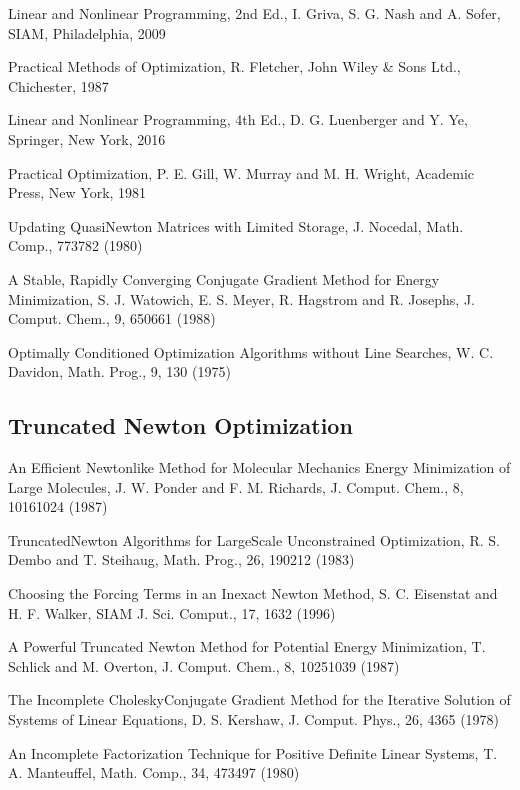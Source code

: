 \documentclass[letterpaper,11pt,english]{sphinxmanual}
\begin{document}
Linear and Nonlinear Programming, 2nd Ed., I. Griva, S. G. Nash and A. Sofer, SIAM, Philadelphia, 2009

Practical Methods of Optimization, R. Fletcher, John Wiley \& Sons Ltd., Chichester, 1987

Linear and Nonlinear Programming, 4th Ed., D. G. Luenberger and Y. Ye, Springer, New York, 2016

Practical Optimization, P. E. Gill, W. Murray and M. H. Wright, Academic Press, New York, 1981

Updating Quasi\sphinxhyphen{}Newton Matrices with Limited Storage, J. Nocedal, Math. Comp., 773\sphinxhyphen{}782 (1980)

A Stable, Rapidly Converging Conjugate Gradient Method for Energy Minimization, S. J. Watowich, E. S. Meyer, R. Hagstrom and R. Josephs, J. Comput. Chem., 9, 650\sphinxhyphen{}661 (1988)

Optimally Conditioned Optimization Algorithms without Line Searches, W. C. Davidon, Math. Prog., 9, 1\sphinxhyphen{}30 (1975)


\subsection{Truncated Newton Optimization}
\label{\detokenize{text/references:truncated-newton-optimization}}
An Efficient Newton\sphinxhyphen{}like Method for Molecular Mechanics Energy Minimization of Large Molecules, J. W. Ponder and F. M. Richards, J. Comput. Chem., 8, 1016\sphinxhyphen{}1024 (1987)

Truncated\sphinxhyphen{}Newton Algorithms for Large\sphinxhyphen{}Scale Unconstrained Optimization, R. S. Dembo and T. Steihaug, Math. Prog., 26, 190\sphinxhyphen{}212 (1983)

Choosing the Forcing Terms in an Inexact Newton Method, S. C. Eisenstat and H. F. Walker, SIAM J. Sci. Comput., 17, 16\sphinxhyphen{}32 (1996)

A Powerful Truncated Newton Method for Potential Energy Minimization, T. Schlick and M. Overton, J. Comput. Chem., 8, 1025\sphinxhyphen{}1039 (1987)

The Incomplete Cholesky\sphinxhyphen{}Conjugate Gradient Method for the Iterative Solution of Systems of Linear Equations, D. S. Kershaw, J. Comput. Phys., 26, 43\sphinxhyphen{}65 (1978)

An Incomplete Factorization Technique for Positive Definite Linear Systems, T. A. Manteuffel, Math. Comp., 34, 473\sphinxhyphen{}497 (1980)
\end{document}
